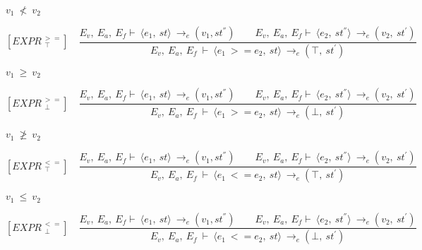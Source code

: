 	
	\begin{math}		
		v_1 \ \not< \ v_2		
	\end{math}
	
	
	
	
	
	\[	
	[EXPR^{\ >=}_{\ \ \top}] \quad	
	\dfrac{E_v, \ E_a, \ E_f \vdash \ \langle e_1, \ st \rangle \ \rightarrow_e (v_1, st^{''}) \qquad E_v, \ E_a, \ E_f \vdash \ \langle e_2, \ st^{''} \rangle \ \rightarrow_e (v_2, \ st^{'})}{E_v, \ E_a, \ E_f \ \vdash \ \langle e_1 \ >= e_2, \ st \rangle \ \rightarrow_e (\top, \ st^{'})}	
	\]
	
	
	\begin{math}		
		v_1 \ \ge \ v_2		
	\end{math} 
	
	
	
	
	
	
	
	
	\[	
	[EXPR^{\ >=}_{\ \ \bot}] \quad	
	\dfrac{E_v, \ E_a, \ E_f \vdash \ \langle e_1, \ st \rangle \ \rightarrow_e (v_1, st^{''}) \qquad E_v, \ E_a, \ E_f \vdash \ \langle e_2, \ st^{''} \rangle \ \rightarrow_e (v_2, \ st^{'})}{E_v, \ E_a, \ E_f \ \vdash \ \langle e_1 \ >= e_2, \ st \rangle \ \rightarrow_e (\bot, \ st^{'})}	
	\]
	
	
	\begin{math}		
		v_1 \ \ngeq \ v_2		
	\end{math}
	
	
	
	
	
	\[
	[EXPR^{\ <=}_{\ \ \top}] \quad
	\dfrac{E_v, \ E_a, \ E_f \vdash \ \langle e_1, \ st \rangle \ \rightarrow_e (v_1, st^{''}) \qquad E_v, \ E_a, \ E_f \vdash \ \langle e_2, \ st^{''} \rangle \ \rightarrow_e (v_2, \ st^{'})}{E_v, \ E_a, \ E_f \ \vdash \ \langle e_1 \ <= e_2, \ st \rangle \ \rightarrow_e (\top, \ st^{'})}
	\]
	
	
	\begin{math}		
		v_1 \ \le \ v_2		
	\end{math} 
	
	
	
	
	
	
	
	
	\[	
	[EXPR^{\ <=}_{\ \ \bot}] \quad	
	\dfrac{E_v, \ E_a, \ E_f \vdash \ \langle e_1, \ st \rangle \ \rightarrow_e (v_1, st^{''}) \qquad E_v, \ E_a, \ E_f \vdash \ \langle e_2, \ st^{''} \rangle \ \rightarrow_e (v_2, \ st^{'})}{E_v, \ E_a, \ E_f \ \vdash \ \langle e_1 \ <= e_2, \ st \rangle \ \rightarrow_e (\bot, \ st^{'})}	
	\]
	
